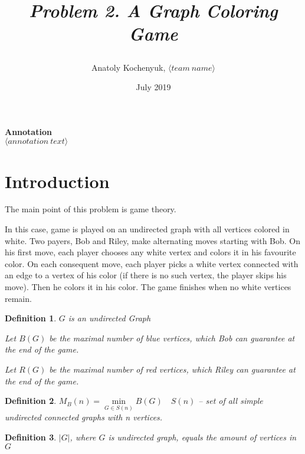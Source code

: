 \documentclass[12pt,a4paper, flushleft]{article}
\author{Anatoly Kochenyuk, $\langle team~name\rangle$}
\date{July 2019}
\title{
	\vspace{4cm}	
	\horline{440}	
	\begin{center}
		\begin{Huge}
			\textbf{\emph{Problem 2. A Graph Coloring Game}}
		\end{Huge}
	\end{center}	
	\vspace{-1.3cm}	
	\horline{460}
}
\newtheorem{Def}{Definition}[section]
\newcommand{\lr}[1]{\langle #1 \rangle}
\begin{document}
\maketitle
\vspace{4cm}
	
	\begin{myquote}
	\begin{center}
		\textbf{Annotation}\\
		\textit{
			$\lr{annotation~text}$
		}
	\end{center}
	\end{myquote}	
	
	\pagebreak

	\tableofcontents	
	
	\pagebreak
	
\section*{Introduction}
The main point of this problem is game theory.

In this case, game is played on an undirected graph with all vertices colored in white. Two payers, Bob and Riley, make alternating moves starting with Bob. On his first move, each player chooses
any white vertex and colors it in his favourite color. On each consequent move, each player picks
a white vertex connected with an edge to a vertex of his color (if there is no such vertex, the
player skips his move). Then he colors it in his color. The game finishes when no white vertices
remain.

\begin{Def}
	$G$ is an undirected Graph

	Let $B(G)$ be the maximal number of blue vertices, which Bob can guarantee at the end of
the game.

	Let $R(G)$ be the maximal number of red vertices, which Riley can guarantee at the
end of the game.
\end{Def}

\begin{Def}
	$M_B(n) = \min\limits_{G\in S(n)}B(G)\quad S(n)$ -- set of all simple undirected connected graphs with n vertices.
\end{Def}

\begin{Def}
	$|G|$, where $G$ is undirected graph, equals the amount of vertices in $G$
\end{Def}
\end{document}
